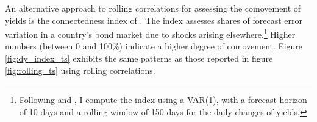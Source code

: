 

An alternative approach to rolling correlations for assessing the comovement of yields is the connectedness index of \cite{DieboldYilmaz:2014}. 
The index assesses shares of forecast error variation in a country's bond market due to shocks arising elsewhere.\footnote{ Following \cite{ACDM:2019} and \cite{BostanciYilmaz:2020}, I compute the index  using a VAR(1), with a forecast horizon of 10 days and a rolling window of 150 days for the daily changes of yields.} %
Higher numbers (between 0 and 100\%) indicate a higher degree of comovement. 
Figure \ref{fig:dy_index_ts} exhibits the same patterns as those reported in figure \ref{fig:rolling_ts} using rolling correlations.

